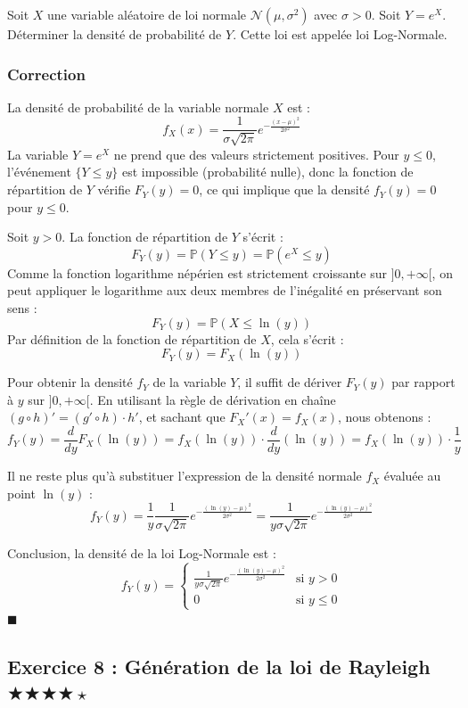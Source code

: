 \documentclass[11pt,a4paper]{article}
\begin{document}
Soit $X$ une variable aléatoire de loi normale $\mathcal{N}(\mu, \sigma^2)$ avec $\sigma > 0$.
Soit $Y = e^X$.
Déterminer la densité de probabilité de $Y$. Cette loi est appelée loi Log-Normale.

\subsubsection*{Correction}

La densité de probabilité de la variable normale $X$ est :
$$ f_X(x) = \frac{1}{\sigma\sqrt{2\pi}} e^{-\frac{(x - \mu)^2}{2\sigma^2}} $$
La variable $Y = e^X$ ne prend que des valeurs strictement positives.
Pour $y \leq 0$, l'événement $\{Y \leq y\}$ est impossible (probabilité nulle), donc la fonction de répartition de $Y$ vérifie $F_Y(y) = 0$, ce qui implique que la densité $f_Y(y) = 0$ pour $y \leq 0$.

Soit $y > 0$. La fonction de répartition de $Y$ s'écrit :
$$ F_Y(y) = \mathbb{P}(Y \leq y) = \mathbb{P}(e^X \leq y) $$
Comme la fonction logarithme népérien est strictement croissante sur $]0, +\infty[$, on peut appliquer le logarithme aux deux membres de l'inégalité en préservant son sens :
$$ F_Y(y) = \mathbb{P}(X \leq \ln(y)) $$
Par définition de la fonction de répartition de $X$, cela s'écrit :
$$ F_Y(y) = F_X(\ln(y)) $$

Pour obtenir la densité $f_Y$ de la variable $Y$, il suffit de dériver $F_Y(y)$ par rapport à $y$ sur $]0, +\infty[$. En utilisant la règle de dérivation en chaîne $(g \circ h)' = (g' \circ h) \cdot h'$, et sachant que $F_X'(x) = f_X(x)$, nous obtenons :
$$ f_Y(y) = \frac{d}{dy} F_X(\ln(y)) = f_X(\ln(y)) \cdot \frac{d}{dy}(\ln(y)) = f_X(\ln(y)) \cdot \frac{1}{y} $$

Il ne reste plus qu'à substituer l'expression de la densité normale $f_X$ évaluée au point $\ln(y)$ :
$$ f_Y(y) = \frac{1}{y} \frac{1}{\sigma\sqrt{2\pi}} e^{-\frac{(\ln(y) - \mu)^2}{2\sigma^2}} = \frac{1}{y\sigma\sqrt{2\pi}} e^{-\frac{(\ln(y) - \mu)^2}{2\sigma^2}} $$

Conclusion, la densité de la loi Log-Normale est :
$$ f_Y(y) = \begin{cases} \frac{1}{y\sigma\sqrt{2\pi}} e^{-\frac{(\ln(y) - \mu)^2}{2\sigma^2}} & \text{si } y > 0 \\ 0 & \text{si } y \leq 0 \end{cases} $$ $\blacksquare$


\subsection*{Exercice 8 : Génération de la loi de Rayleigh \quad $\bigstar\bigstar\bigstar\bigstar\star$}
\end{document}

